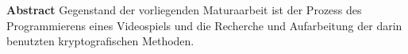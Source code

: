 \textbf{Abstract}
Gegenstand der vorliegenden Maturaarbeit ist der Prozess des Programmierens eines Videospiels und die Recherche und Aufarbeitung der darin benutzten kryptografischen Methoden.
